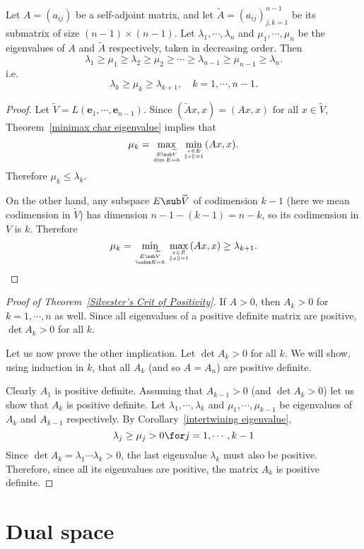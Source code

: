 \begin{corollary}\label{intertwining eigenvalue}
Let $A=(a_{ij})$ be a self-adjoint matrix, and let $\widetilde{A}=(a_{ij})_{j,k=1}^{n-1}$ be its submatrix of size $(n-1)\times(n-1)$. Let $\lambda_1,\cdots,\lambda_n$ and $\mu_1,\cdots,\mu_n$ be the eigenvalues of $A$ and $\widetilde{A}$ respectively, taken in decreasing order. Then
\[\lambda_1\geq\mu_1\geq\lambda_2\geq\mu_2\geq\cdots\geq\lambda_{n-1}\geq\mu_{n-1}\geq\lambda_n.\]
i.e.
\[\lambda_k\geq\mu_k\geq\lambda_{k+1},\quad k=1,\cdots,n-1.\]
\end{corollary}
\begin{proof}
Let $\widetilde{V}=L(\bm{e}_1,\cdots,\bm{e}_{n-1})$. Since $(\widetilde{A}x,x) =(Ax,x)$ for all $x\in\widetilde{V}$, Theorem~\ref{minimax char eigenvalue} implies that
\[\mu_k=\max_{E\sub\widetilde{V}\atop\dim E=k}\min_{x\in E\atop\|x\|=1}(Ax,x).\]
Therefore $\mu_k\leq\lambda_k$.\par
On the other hand, any subspace $E\sub\widetilde{V}$ of codimension $k-1$ (here
we mean codimension in $\widetilde{V}$) has dimension $n-1-(k-1)=n-k$, so its
codimension in $V$ is $k$. Therefore
\[\mu_k=\min_{E\sub\widetilde{V}\atop\codim E=k}\max_{x\in E\atop\|x\|=1}(Ax,x)\geq\lambda_{k+1}.\]
\end{proof}
\begin{proof}[Proof of Theorem~\ref{Silvester's Crit of Positivity}]
If $A>0$, then $A_k>0$ for $k=1,\cdots,n$ as well. Since all eigenvalues of a positive definite matrix are positive, $\det A_k>0$ for all $k$.\par
Let us now prove the other implication. Let $\det A_k>0$ for all $k$. We will show, using induction in $k$, that all $A_k$ (and so $A=A_n$) are positive definite.\par
Clearly $A_1$ is positive definite. Assuming that $A_{k-1}>0$ (and $\det A_k>0$) let us show that $A_k$ is positive definite. Let $\lambda_1,\cdots,\lambda_k$ and $\mu_1,\cdots,\mu_{k-1}$ be eigenvalues of $A_k$ and $A_{k-1}$ respectively. By Corollary~\ref{intertwining eigenvalue},
\[\lambda_j\geq\mu_j>0\for j=1,\cdots,k-1\]
Since $\det A_k=\lambda_1\cdots\lambda_k>0$, the last eigenvalue $\lambda_k$ must also be positive. Therefore, since all its eigenvalues are positive, the matrix $A_k$ is positive definite.
\end{proof}
\section{Dual space}
